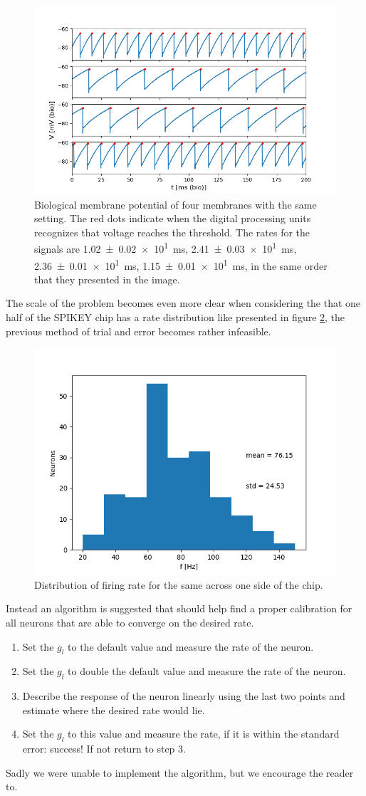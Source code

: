 \documentclass[a4paper,twocolumn]{article}
\begin{document}
\begin{figure}[ht]
    \centering
    \includegraphics[width=.5\textwidth]{figures/4membranes.png}
    \caption{Biological membrane potential of four membranes with the same
    setting. The red dots indicate when the digital processing units recognizes
    that voltage reaches the threshold. The rates for the signals are
    \SI{1.02(2)e1}{\milli\second}, \SI{2.41(3)e1}{\milli\second},
    \SI{2.36(1)e1}{\milli\second}, \SI{1.15(1)e1}{\milli\second}, in the same
    order that they presented in the image. }
    \label{fig:4membranes}
\end{figure}

The scale of the problem becomes even more clear when considering the that one
half of the SPIKEY chip has a rate distribution like presented in figure
\ref{fig:distribution}, the previous method of trial and error becomes rather
infeasible.

\begin{figure}[ht]
    \centering
    \includegraphics[width=.5\textwidth]{figures/rate-distribution.png}
    \caption{Distribution of firing rate for the same across one side of the
    chip.}
    \label{fig:distribution}
\end{figure}

Instead an algorithm is suggested that should help find a proper calibration for
all neurons that are able to converge on the desired rate.
\begin{enumerate}
    \item Set the $g_l$ to the default value and measure the rate of the neuron.
    \item Set the $g_l$ to double the default value and measure the rate of the
        neuron.
    \item Describe the response of the neuron linearly using the last two
        points and estimate where the desired rate would lie.
    \item Set the $g_l$ to this value and measure the rate, if it is within the
        standard error: success! If not return to step 3.
\end{enumerate}
Sadly we were unable to implement the algorithm, but we encourage the reader
to.
\end{document}
